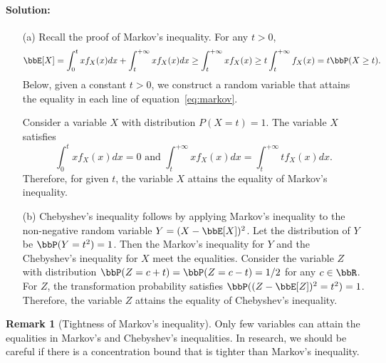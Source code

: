 \documentclass[11pt]{article}
\theoremstyle{plain}
\theoremstyle{definition}
\newtheorem{rmk}{Remark}
\begin{document}
\paragraph{Solution:} 
\begin{enumerate}
	\item[(a)] Recall the proof of Markov's inequality. For any $t >0$,
	\begin{equation}\label{eq:markov}
		\bbE[X] = \int_{0}^t x f_X(x) dx + \int_{t}^{+\infty} x f_X(x) dx \geq \int_{t}^{+\infty} x f_X(x)\geq t \int_{t}^{+\infty} f_X(x) = t \bbP( X \geq t).
	\end{equation}
	Below, given a constant $t > 0$, we construct a random variable that attains the equality in each line of equation~\eqref{eq:markov}.
	 
	 Consider a variable $X$ with distribution $P(X = t) = 1$. The variable $X$ satisfies 
	 \[ \int_{0}^t x f_X(x) dx = 0 \text{ and } \int_{t}^{+\infty} x f_X(x) dx =\int_{t}^{+\infty} t f_X(x) dx. \]
	 Therefore, for given $t$, the variable $X$ attains the equality of Markov's inequality.
	 
	 \item[(b)] Chebyshev's inequality follows by applying Markov's inequality to the non-negative random variable $Y = {(X - \bbE[X])^2}$. Let the distribution of $Y$ be $\bbP(Y = t^2) = 1$. Then the Markov's inequality for $Y$ and the Chebyshev's inequality for $X$ meet the equalities. Consider the variable $Z$ with distribution $\bbP(Z = c+t) = \bbP(Z = c-t)  = 1/2 $ for any $ c \in \bbR$. For $Z$, the transformation probability satisfies $\bbP((Z - \bbE[Z])^2= t^2) = 1$. Therefore, the variable $Z$ attains the equality of Chebyshev's inequality.
\end{enumerate}

\begin{rmk}[Tightness of Markov's inequality]
	Only few variables can attain the equalities in Markov's and Chebyshev's inequalities. In research, we should be careful if there is a concentration bound that is tighter than Markov's inequality.
\end{rmk}
\end{document}
